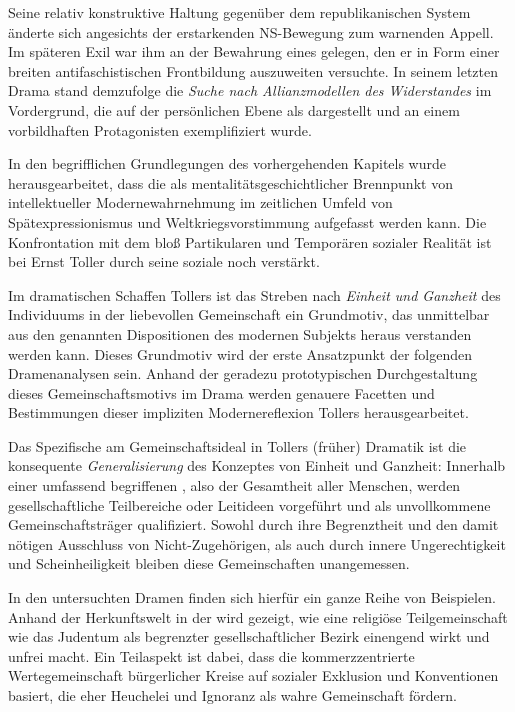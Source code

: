 Seine relativ konstruktive Haltung gegenüber dem republikanischen System
änderte sich angesichts der erstarkenden NS-Bewegung zum warnenden Appell. Im
späteren Exil war ihm an der Bewahrung eines  gelegen, den er in Form einer breiten antifaschistischen
Frontbildung auszuweiten
versuchte. In seinem letzten Drama stand demzufolge die \emph{Suche nach
Allianzmodellen des Widerstandes} im Vordergrund, die auf der persönlichen
Ebene als \Cite{Weg der Wahrheit} dargestellt und an einem vorbildhaften
Protagonisten exemplifiziert wurde.


In den begrifflichen Grundlegungen des vorhergehenden Kapitels wurde
herausgearbeitet, dass die \Cite{Dissoziation des Subjekts} als
mentalitätsgeschichtlicher Brennpunkt von intellektueller
Modernewahrnehmung im zeitlichen Umfeld von Spätexpressionismus und
Weltkriegsvorstimmung aufgefasst werden kann. Die Konfrontation mit dem
bloß Partikularen und Temporären sozialer Realität ist bei Ernst Toller durch seine
soziale \Cite{Randlage} noch verstärkt.

Im dramatischen Schaffen Tollers ist das Streben nach \emph{Einheit und
Ganzheit} des Individuums \Cite{als Mensch} in der liebevollen Gemeinschaft
\Cite{der Menschheit} ein Grundmotiv, das unmittelbar aus den genannten
Dispositionen des modernen Subjekts heraus verstanden werden kann.
Dieses Grundmotiv wird der erste Ansatzpunkt der folgenden Dramenanalysen
sein. Anhand der geradezu prototypischen Durchgestaltung dieses
Gemeinschaftsmotivs im Drama  werden genauere Facetten
und Bestimmungen dieser impliziten Modernereflexion Tollers
herausgearbeitet.

Das Spezifische am Gemeinschaftsideal in Tollers (früher) Dramatik ist die
konsequente \emph{Generalisierung} des Konzeptes von Einheit und Ganzheit: Innerhalb
einer umfassend begriffenen \Cite{Menschheit}, also der Gesamtheit aller Menschen,
werden gesellschaftliche Teilbereiche oder Leitideen vorgeführt und als unvollkommene
Gemeinschaftsträger qualifiziert. Sowohl durch ihre Begrenztheit und den
damit nötigen Ausschluss von Nicht-Zugehörigen, als auch durch innere
Ungerechtigkeit und Scheinheiligkeit bleiben diese Gemeinschaften \Cite{dem
Menschen} unangemessen.  

In den untersuchten Dramen finden sich hierfür ein ganze Reihe von Beispielen.
Anhand der Herkunftswelt in der  wird gezeigt, wie eine
religiöse Teilgemeinschaft wie das Judentum als begrenzter gesellschaftlicher
Bezirk einengend wirkt und unfrei macht. Ein Teilaspekt ist dabei, dass die
kommerzzentrierte Wertegemeinschaft bürgerlicher Kreise auf sozialer Exklusion
und Konventionen basiert, die eher Heuchelei und Ignoranz als wahre
Gemeinschaft fördern. 

